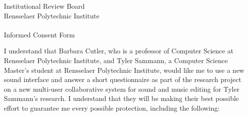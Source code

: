 \documentclass[10pt]{article}
\begin{document}
% 
% 
% 
% 
% 
% 
% 
% 
% 


\newpage

\pagestyle{empty}

\begin{center}
{\Large {
Institutional Review Board \\ \vspace{0.1in}
Rensselaer Polytechnic Institute} }\\
\ \\
{\large Informed Consent Form}
\end{center}

\noindent
I understand that Barbara Cutler, who is a professor of Computer
Science at Rensselaer Polytechnic Institute, and Tyler Sammann, a Computer
Science Master's student at Rensselaer Polytechnic Institute, would like me to use a
new sound interface and answer a short questionnaire as part of the
research project on a new multi-user collaborative system for sound
and music editing for Tyler Sammann's research.  I understand that they
will be making their best possible effort to guarantee me every possible
protection, including the following:
\end{document}
